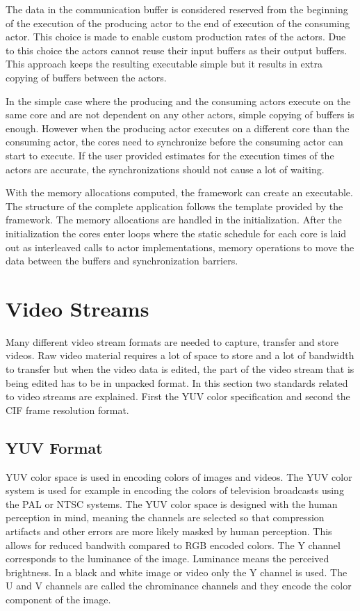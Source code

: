 The data in the communication buffer is considered reserved from the beginning of the execution of the producing actor to the end of execution of the consuming actor. This choice is made to enable custom production rates of the actors. Due to this choice the actors cannot reuse their input buffers as their output buffers. \cite{desnos2012memory} This approach keeps the resulting executable simple but it results in extra copying of buffers between the actors.

In the simple case where the producing and the consuming actors execute on the same core and are not dependent on any other actors, simple copying of buffers is enough. However when the producing actor executes on a different core than the consuming actor, the cores need to synchronize before the consuming actor can start to execute. If the user provided estimates for the execution times of the actors are accurate, the synchronizations should not cause a lot of waiting.~\cite{pelcat2014preesm}

With the memory allocations computed, the framework can create an executable. The structure of the complete application follows the template provided by the framework. The memory allocations are handled in the initialization. After the initialization the cores enter loops where the static schedule for each core is laid out as interleaved calls to actor implementations, memory operations to move the data between the buffers and synchronization barriers.

\section{Video Streams}
\label{sec:video-streams}
Many different video stream formats are needed to capture, transfer and store videos. Raw video material requires a lot of space to store and a lot of bandwidth to transfer but when the video data is edited, the part of the video stream that is being edited has to be in unpacked format. In this section two standards related to video streams are explained. First the YUV color specification and second the CIF frame resolution format.

\subsection{YUV Format}
\label{subsec:yuv}
YUV color space is used in encoding colors of images and videos. The YUV color system is used for example in encoding the colors of television broadcasts using the PAL or NTSC systems. The YUV color space is designed with the human perception in mind, meaning the channels are selected so that compression artifacts and other errors are more likely masked by human perception. This allows for reduced bandwith compared to RGB encoded colors. The Y channel corresponds to the luminance of the image. Luminance means the perceived brightness. In a black and white image or video only the Y channel is used. The U and V channels are called the chrominance channels and they encode the color component of the image.~\cite{jack2011video}

